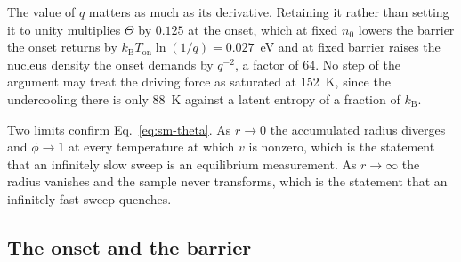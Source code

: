\documentclass[reprint,twocolumn,prb,amsmath,amssymb,superscriptaddress,floatfix]{revtex4-2}
\newcommand{\kB}{k_{\mathrm{B}}}
\newcommand{\Ton}{T_{\mathrm{on}}}
\begin{document}
The value of $q$ matters as much as its derivative. Retaining it rather than setting it to
unity multiplies $\Theta$ by $0.125$ at the onset, which at fixed $n_{0}$ lowers the barrier
the onset returns by $\kB\Ton\ln(1/q)=0.027$~eV and at fixed barrier raises the nucleus density
the onset demands by $q^{-2}$, a factor of $64$. No step of the argument may treat the driving
force as saturated at 152~K, since the undercooling there is only $88$~K against a latent
entropy of a fraction of $\kB$.

Two limits confirm Eq.~\eqref{eq:sm-theta}. As $r\to0$ the accumulated radius diverges and
$\phi\to1$ at every temperature at which $v$ is nonzero, which is the statement that an
infinitely slow sweep is an equilibrium measurement. As $r\to\infty$ the radius vanishes and the
sample never transforms, which is the statement that an infinitely fast sweep quenches.

\subsection{The onset and the barrier}
\end{document}

